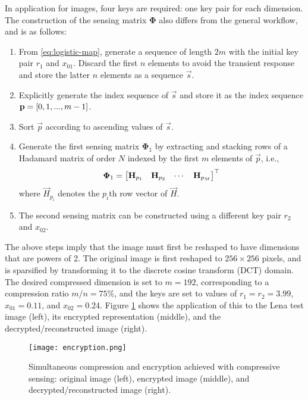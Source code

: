 In application for images, four keys are required: one key pair for each dimension. The construction of the sensing matrix $\bm\Phi$ also differs from the general workflow, and is as follows:

\begin{enumerate}
	\item From \eqref{eq:logistic-map}, generate a sequence of length $2m$ with the initial key pair $r_1$ and $x_{01}$. Discard the first $n$ elements to avoid the transient response and store the latter $n$ elements as a sequence $\vec{s}$.
	\item Explicitly generate the index sequence of $\vec{s}$ and store it as the index sequence $\text{\bfseries p} = \qty[0, 1, ..., m-1]$.
	\item Sort $\vec{p}$ according to ascending values of $\vec{s}$.
	\item Generate the first sensing matrix $\bm\Phi_1$ by extracting and stacking rows of a Hadamard matrix of order $N$ indexed by the first $m$ elements of $\vec{p}$, i.e.,
	\begin{equation}\label{eq:construct-hadamard}
		\bm\Phi_1 = \mqty[
			\vec{H}_{p_1} & \vec{H}_{p_2} & \cdots & \vec{H}_{p_M}
		]^\top
	\end{equation}
	\noindent where $\vec{H}_{p_i}$ denotes the $p_i$th row vector of $\vec{H}$.
	\item The second sensing matrix can be constructed using a different key pair $r_2$ and $x_{02}$.
\end{enumerate}

The above steps imply that the image must first be reshaped to have dimensions that are powers of 2. The original image is first reshaped to $256 \times 256$ pixels, and is sparsified by transforming it to the discrete cosine transform (DCT) domain. The desired compressed dimension is set to $m = 192$, corresponding to a compression ratio $m/n = 75\%$, and the keys are set to values of $r_1 = r_2 = 3.99$, $x_{01} = 0.11$, and $x_{02} = 0.24$. Figure \ref{fig:encryption} shows the application of this to the Lena test image (left), its encrypted representation (middle), and the decrypted/reconstructed image (right).

\begin{figure}[htb]
	\texttt{[image: encryption.png]}
	\caption{Simultaneous compression and encryption achieved with compressive sensing: original image (left), encrypted image (middle), and decrypted/reconstructed image (right).}
	\label{fig:encryption}
\end{figure}